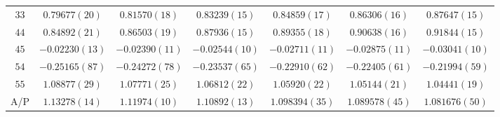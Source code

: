 \begin{table}
\begin{center}
\begin{tabular}{c|c c c c c c}
$33$ & $0.79677(20)$ & $0.81570(18)$ & $0.83239(15)$ & $0.84859(17)$ & $0.86306(16)$ & $0.87647(15)$ \\
$44$ & $0.84892(21)$ & $0.86503(19)$ & $0.87936(15)$ & $0.89355(18)$ & $0.90638(16)$ & $0.91844(15)$ \\
$45$ & $-0.02230(13)$ & $-0.02390(11)$ & $-0.02544(10)$ & $-0.02711(11)$ & $-0.02875(11)$ & $-0.03041(10)$ \\
$54$ & $-0.25165(87)$ & $-0.24272(78)$ & $-0.23537(65)$ & $-0.22910(62)$ & $-0.22405(61)$ & $-0.21994(59)$ \\
$55$ & $1.08877(29)$ & $1.07771(25)$ & $1.06812(22)$ & $1.05920(22)$ & $1.05144(21)$ & $1.04441(19)$ \\
\hline
A/P & $1.13278(14)$ & $1.11974(10)$ & $1.10892(13)$ & $1.098394(35)$ & $1.089578(45)$ & $1.081676(50)$ \\
\hline
\hline
\end{tabular}
\end{center}
\end{table}